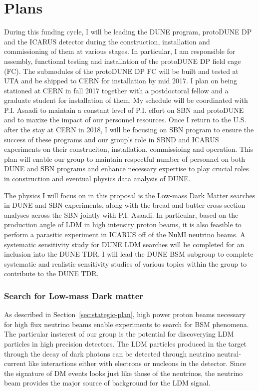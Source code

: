 \section*{\textbf{Plans}}
During this funding cycle, I will be leading the DUNE program, protoDUNE DP and the ICARUS detector during the construction, installation and commissioning of them at various stages. In particular, I am responsible for assembly, functional testing and installation of the protoDUNE DP field cage (FC).  The submodules of the protoDUNE DP FC will be built and tested at UTA and be shipped to CERN for installation by mid 2017.  I plan on being stationed at CERN in fall 2017 together with a postdoctoral fellow and a graduate student for installation of them.  My schedule will be coordinated with P.I. Asaadi to maintain a constant level of P.I. effort on SBN and protoDUNE and to maxize the impact of our personnel resources.  Once I return to the U.S. after the stay at CERN in 2018, I will be focusing on SBN program to ensure the success of these programs and our group's role in SBND and ICARUS experiments on their construciton, installation, commissioing and operation.  This plan will enable our group to maintain respectful number of personnel on both DUNE and SBN programs and enhance necessary expertise to play crucial roles in construction and eventual physics data analysis of DUNE.

The physics I will focus on in this proposal is the Low-mass Dark Matter searches in DUNE and SBN experiments, along with the bread and butter cross-section analyses across the SBN jointly with P.I. Asaadi.  In particular, based on the production angle of LDM in high intensity proton beams, it is also feasible to perform a parasitic experiment in ICARUS off of the NuMI neutrino beams.   A systematic sensitivity study for DUNE LDM searches will be completed for an inclusion into the DUNE TDR.  I will lead the DUNE BSM subgroup to complete systematic and realistic sensitivity studies of various topics within the group to contribute to the DUNE TDR.
\subsubsection{ Search for Low-mass Dark matter}
As described in Section~\ref{sec:stategic-plan}, high power proton beams necessary for high flux neutrino beams enable experiments to search for BSM phenomena.  The particular insterest of our group is the potential for discoverying LDM particles in high precision detectors. The LDM particles produced in the target through the decay of dark photons can be detected through neutrino neutral-current like interactions either with electrons or nucleons in the detector. Since the signature of DM events looks just like those of the neutrinos, the neutrino beam provides the major source of background for the LDM signal. 

